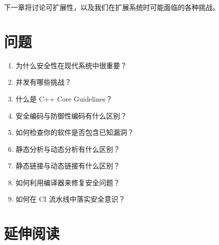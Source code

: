 下一章将讨论可扩展性，以及我们在扩展系统时可能面临的各种挑战。

\section{问题}

\begin{enumerate}
\item 为什么安全性在现代系统中很重要？
\item 并发有哪些挑战？
\item 什么是 C++ Core Guidelines？
\item 安全编码与防御性编码有什么区别？
\item 如何检查你的软件是否包含已知漏洞？
\item 静态分析与动态分析有什么区别？
\item 静态链接与动态链接有什么区别？
\item 如何利用编译器来修复安全问题？
\item 如何在 CI 流水线中落实安全意识？
\end{enumerate}

\section{延伸阅读}

